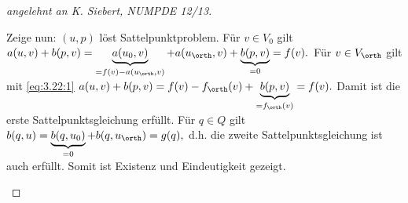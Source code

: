 \begin{st}
\begin{proof}[angelehnt an K. Siebert, NUMPDE 12/13]
\begin{seg}[\ProofImplication*]
			Zeige nun: $(u,p)$ löst Sattelpunktproblem.
			Für $v \in V_0$ gilt
			\begin{math}
				a(u,v) + b(p,v)
				= \underbrace{a(u_0,v)}_{=f(v) - a(u_\orth, v)} + a(u_\orth, v ) + \underbrace{b(p,v)}_{=0}
				= f(v).
			\end{math}
			Für $v \in V_\orth$ gilt mit \eqref{eq:3.22:1}
			\begin{math}
				a(u,v) + b(p,v)
				= f(v) - f_\orth(v) + \underbrace{b(p,v)}_{=f_\orth(v)}
				= f(v).
			\end{math}
			Damit ist die erste Sattelpunktsgleichung erfüllt.
			Für $q \in Q$ gilt
			\begin{math}
				b(q,u)
				= \underbrace{b(q, u_0)}_{=0} + b(q, u_\orth)
				= g(q),
			\end{math}
			d.h. die zweite Sattelpunktsgleichung ist auch erfüllt.
			Somit ist Existenz und Eindeutigkeit gezeigt.


\end{seg}
\end{proof}
\end{st}
